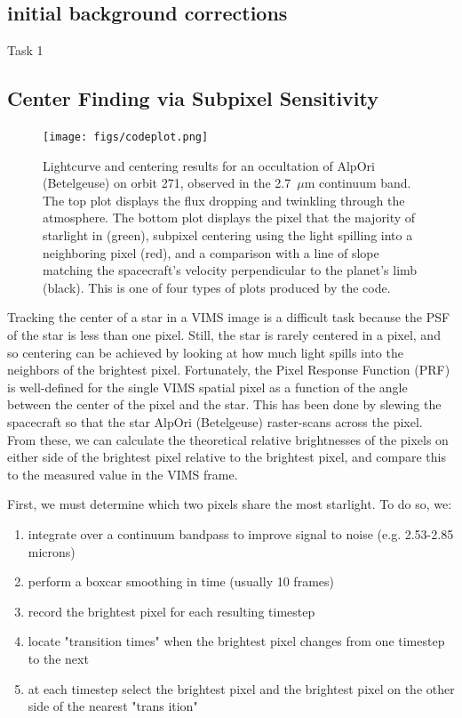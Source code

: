 \documentclass[twocolumn, twocolappendix, numberedappendix, linenumbers]{aastex631}
\begin{document}
\subsection{initial background corrections}
Task 1

\subsection{Center Finding via Subpixel Sensitivity}

\begin{figure}[ht]
  \centering
  \texttt{[image: figs/codeplot.png]}
  \caption{Lightcurve and centering results for an occultation of AlpOri
(Betelgeuse) on orbit 271, observed in the 2.7~$\mu$m continuum band. The top
plot displays the flux dropping and twinkling through the atmosphere. The
bottom plot displays the pixel that the majority of starlight in (green),
subpixel centering using the light spilling into a neighboring pixel (red),
and a comparison with a line of slope matching the spacecraft's velocity perpendicular
to the planet's limb (black).  This is one of four types of plots produced by
the code.}
  \label{fig:codeplots}
\end{figure}

Tracking the center of a star in a VIMS image is a difficult task because the
PSF of the star is less than one pixel. Still, the star is rarely centered in a
pixel, and so centering can be achieved by looking at how much light spills
into the neighbors of the brightest pixel. Fortunately, the Pixel Response
Function (PRF) is well-defined for the single VIMS spatial pixel as a function
of the angle between the center of the pixel and the star. This has been done
by slewing the spacecraft so that the star AlpOri (Betelgeuse) raster-scans
across the pixel. From these, we can calculate the theoretical relative
brightnesses of the pixels on either side of the brightest pixel relative to
the brightest pixel, and compare this to the measured value in the VIMS frame.

First, we must determine which two pixels share the most starlight. To do so,
we:
\begin{enumerate}
  \item integrate over a continuum bandpass to improve signal to noise (e.g. 2.53-2.85 microns)
  \item perform a boxcar smoothing in time (usually 10 frames)
  \item record the brightest pixel for each resulting timestep
  \item locate "transition times" when the brightest pixel changes from one timestep to the next
  \item at each timestep select the brightest pixel and the brightest pixel on the other side of the nearest "trans
ition"
\end{enumerate}
\end{document}
